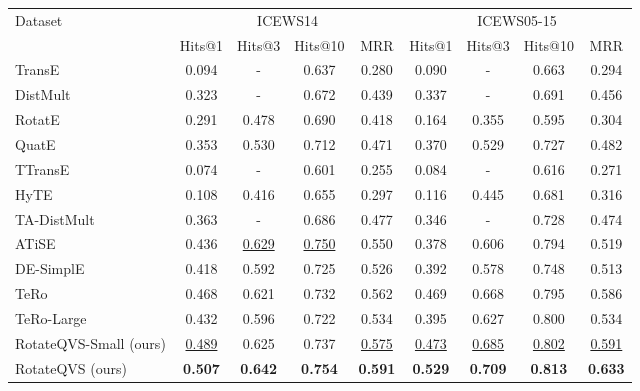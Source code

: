 \documentclass[11pt]{article}
\begin{document}
\begin{table*}[!t]
\centering
\small
\begin{tabular}{@{}lcccc|cccc@{}}
\toprule
\multirow{2}{*}{Dataset}   & \multicolumn{4}{c|}{ICEWS14}   & \multicolumn{4}{c}{ICEWS05-15} \\
\cmidrule{2-9}
   & Hits@1        & Hits@3  & Hits@10  & MRR  & Hits@1           & Hits@3  & Hits@10 & MRR \\
\midrule
TransE \cite{bordes2013translating}      & 0.094        & -  &  0.637 & 0.280  & 0.090           & - & 0.663 & 0.294   \\
DistMult \cite{Yang2015EmbeddingEA}   & 0.323        & - & 0.672 & 0.439  & 0.337           & - & 0.691  & 0.456  \\
RotatE \cite{SunDNT19}    & 0.291        & 0.478 & 0.690 & 0.418 &  0.164          & 0.355 & 0.595 & 0.304 \\
QuatE \cite{zhang2019quaternion}      &  0.353       & 0.530 & 0.712 & 0.471 & 0.370           & 0.529 & 0.727 & 0.482  \\
\midrule
TTransE  \cite{leblay2018deriving} & 0.074        & - & 0.601 & 0.255 & 0.084           & - & 0.616 & 0.271  \\
HyTE \cite{dasgupta2018hyte}       & 0.108        & 0.416 & 0.655 & 0.297 & 0.116           & 0.445 & 0.681 & 0.316 \\
TA-DistMult \cite{garcia2018learning} & 0.363        & - & 0.686 & 0.477 &  0.346          & - & 0.728 & 0.474  \\
ATiSE \cite{xu2019temporal}      & 0.436        & \underline{0.629} & \underline{0.750} & 0.550 &  0.378          & 0.606 & 0.794 & 0.519 \\
DE-SimplE \cite{goel2020diachronic}  & 0.418        & 0.592 & 0.725 & 0.526 &  0.392          & 0.578 & 0.748 & 0.513  \\
\midrule
TeRo \cite{xu2020tero}       &  0.468       & 0.621 & 0.732 & 0.562 &  0.469          & 0.668 & 0.795 & 0.586   \\
TeRo-Large       &  0.432     & 0.596 & 0.722 & 0.534 &  0.395          & 0.627 & 0.800 & 0.534 \\
\midrule
RotateQVS-Small (ours) & \underline{0.489}       &0.625 & 0.737 & \underline{0.575} & \underline{0.473}         & \underline{0.685} & \underline{0.802} & \underline{0.591} \\
RotateQVS (ours) & \bfseries 0.507        &\bfseries 0.642 &\bfseries 0.754 &\bfseries 0.591 &\bfseries  0.529          &\bfseries 0.709 &\bfseries 0.813 &\bfseries 0.633  \\

\end{tabular}
\end{table*}
\end{document}
